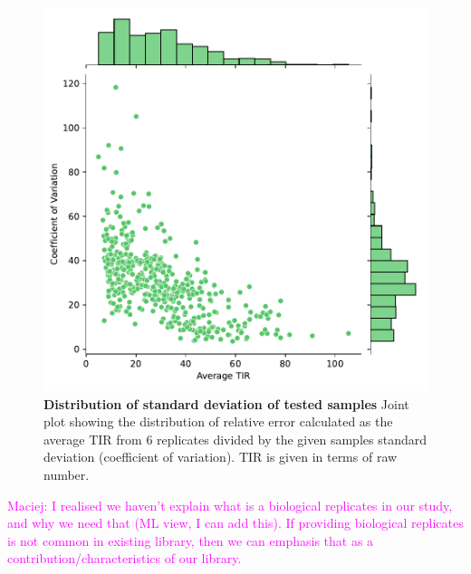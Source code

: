 \documentclass{article}
\newcommand{\mengyan}[1]{\textcolor{magenta}{#1}}
\begin{document}
\begin{figure}[!ht]
    \centering
    \includegraphics[scale=0.75]{plots/Main_Paper/SD.pdf}
    \caption{\textbf{Distribution of standard deviation of tested samples} Joint plot showing the distribution of relative error calculated as the average TIR from 6 replicates divided by the given samples standard deviation (coefficient of variation). TIR is given in terms of raw number.}
    \label{fig: SD}
\end{figure}

\mengyan{Maciej: I realised we haven't explain what is a biological replicates in our study, and why we need that (ML view, I can add this). If providing biological replicates is not common in existing library, then we can emphasis that as a contribution/characteristics of our library.}
\end{document}
